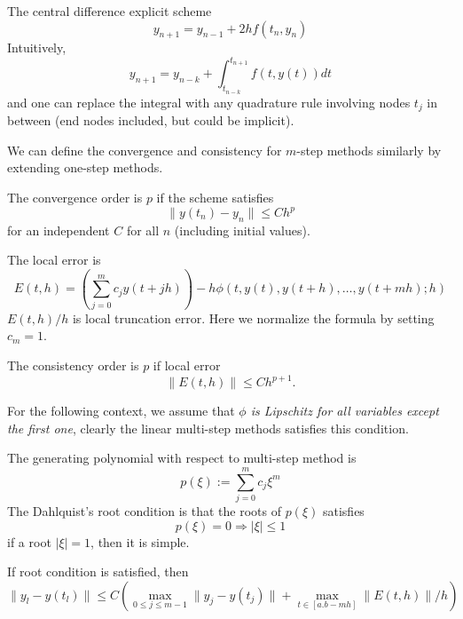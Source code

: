  \begin{example}
     The central difference explicit scheme 
     $$y_{n+1} = y_{n-1} + 2h f(t_n, y_n)$$
     Intuitively, 
     \begin{equation}
         y_{n+1} = y_{n-k} + \int_{t_{n-k}}^{t_{n+1}} f(t, y(t)) dt
     \end{equation}
     and one can replace the integral with any quadrature rule involving nodes $t_{j}$ in between (end nodes included, but could be implicit).
 \end{example}
We can define the convergence and consistency for $m$-step methods similarly by extending one-step methods.
\begin{definition}[convergence]
    The convergence order is $p$ if the scheme satisfies 
    $$\|y(t_n) - y_n\|\le C h^p$$
    for an independent $C$ for all $n$ (including initial values). 
\end{definition}
\begin{definition}
    The local error is
    \begin{equation}
        E(t, h) = \left(\sum_{j=0}^m c_j y(t + jh) \right) - h\phi(t, y(t), y(t+h),\dots, y(t + mh); h)
    \end{equation}
    $E(t, h)/h$ is local truncation error. Here we normalize the formula by setting $c_m = 1$.
\end{definition}
\begin{definition}[consistency]
    The consistency order is $p$ if local error 
    $$\|E(t, h)\|\le C h^{p+1}.$$
\end{definition}
For the following context, we assume that \emph{$\phi$ is Lipschitz for all variables except the first one}, clearly the linear multi-step methods satisfies this condition. 
\begin{definition}
    The generating polynomial with respect to multi-step method is 
    \begin{equation}
        p(\xi) := \sum_{j=0}^m c_j \xi^m
    \end{equation}
    The Dahlquist's root condition is that the roots of $p(\xi)$ satisfies 
    \begin{equation}
        p(\xi) = 0\Rightarrow |\xi|\le 1
    \end{equation}
    if a root $|\xi| = 1$, then it is simple. 
\end{definition}
\begin{theorem}
    If root condition is satisfied, then 
    \begin{equation}
        \|y_l - y(t_l)\|\le C \left(\max_{0\le j\le m-1} \|y_j - y(t_j)\| + \max_{t\in[a. b - mh]} \|E(t, h)\|/h\right)
    \end{equation}
\end{theorem}
